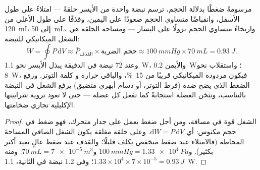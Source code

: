 \begin{theorem}\label{thm:b2:heart:work}
مرسومةً ضغطًا بدلالة الحجم، ترسم نبضة واحدة من  الأيسر
حلقةً --- امتلاءً على طول الأسفل، وانقباضًا متساوي
الحجم صعودًا على اليمين، وقذفًا على طول الأعلى من
\qty{120}{mL} إلى \qty{50}{mL}، وارتخاءً متساوي الحجم نزولًا على
اليسار --- ومساحة الحلقة هي الشغل الميكانيكي
للنبضة:
\[
W = \oint P\,\mathrm{d}V \approx \bar P_{\text{القذف}}\times \text{حجم الضربة} \approx \qty{100}{mmHg}\times\qty{70}{mL} = \qty{0.93}{J}.
\]
وعند 72 نبضة في الدقيقة يبذل  الأيسر نحو \qty{1.1}{W}، والأيمن
\qty{0.2}{W}؛ واستقلاب  نحو \qty{8}{W}، فيكون مردوده
الميكانيكي قريبًا من \qty{15}{\%}، والباقي حرارة و
كلفة التوتر. ورفع الضغط الذي يضخ  ضده
(فرط التوتر، أو دسام أبهري متضيق) يرفع الشغل في النبضة
بالتناسب، وتثخن العضلة استجابةً كما تفعل كل عضلة
--- حتى لا تعود تروية شرايينها الإكليلية تجاري ضخامتها.
\end{theorem}
\begin{proof}
الشغل قوة في مسافة، ومن أجل ضغط يعمل على جدار
متحرك، فهو ضغط في حجم مكنوس: أي $\mathrm{d}W = P\,\mathrm{d}V$.
وعلى حلقة مغلقة يكون الشغل الصافي المساحةَ المحاطة (فالامتلاء عند
ضغط منخفض يكلف قليلًا؛ والقذف عند ضغط عالٍ يعيد أكثر
بكثير). و$\qty{100}{mmHg} = \qty{1.33e4}{Pa}$ و$\qty{70}{mL} =
\qty{7e-5}{m^3}$: ومنه $1.33\times 10^{4}\times 7\times 10^{-5} =
\qty{0.93}{J}$؛ وفي $1.2$ نبضة في الثانية، \qty{1.1}{W}.
\end{proof}

